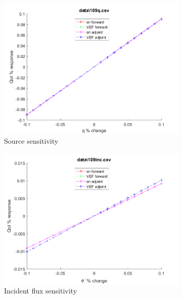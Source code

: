 \documentclass{article}
\begin{document}
\begin{figure}[H]
\label{Case109Sens}
\centering
\begin{subfigure}{.5\textwidth}
  \centering
  \includegraphics[width=.98\linewidth]{IanProposal/figures2/109qSens.png}
  \caption{Source sensitivity}
  \label{fig:sfig1}
\end{subfigure}%
\begin{subfigure}{.5\textwidth}
  \centering
  \includegraphics[width=.98\linewidth]{IanProposal/figures2/109incSens.png}
  \caption{Incident flux sensitivity}
  \label{fig:sfig4}
\end{subfigure}%
\\
\begin{subfigure}{.5\textwidth}
  \centering

\end{subfigure}
\end{figure}
\end{document}
